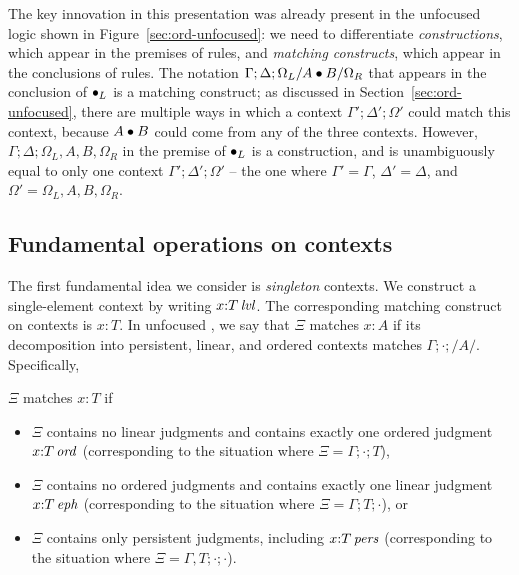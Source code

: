 
The key innovation in this presentation was already present in the
unfocused logic shown in Figure~\ref{sec:ord-unfocused}: we need to
differentiate {\it constructions}, which appear in the premises of
rules, and {\it matching constructs}, which appear in the conclusions
of rules.  The notation $\Gamma; \Delta; \Omega_L/A\mathbin{\bullet} B/\Omega_R$
that appears in the conclusion of ${\mathbin{\bullet}}_L$ is a matching construct;
as discussed in Section~\ref{sec:ord-unfocused}, there are multiple
ways in which a context $\Gamma'; \Delta'; \Omega'$ could match this
context, because $A \mathbin{\bullet} B$ could come from any of the three
contexts. However, $\Gamma; \Delta; \Omega_L,{A},{B}, \Omega_R$ in the
premise of ${\mathbin{\bullet}}_L$ is a construction, and is unambiguously equal
to only one context $\Gamma'; \Delta'; \Omega'$ -- the one where
$\Gamma' = \Gamma$, $\Delta' = \Delta$, and 
$\Omega' = \Omega_L, {A}, {B}, \Omega_R$.

\subsection{Fundamental operations on contexts}
\label{sec:fundamental-operations-on-contexts}

The first fundamental idea we consider is {\it singleton} contexts.
We construct a single-element context by writing $x{:}{T}\,{{\it lvl}}$.
The corresponding matching construct on contexts is 
$x{:}{T}$. In unfocused \ollll, we say that $\Xi$ matches 
$x{:}{A}$ if its decomposition into persistent, linear, and 
ordered contexts matches $\Gamma; \cdot; /A/$. Specifically,

\bigskip
\begin{definition}
  $\Xi$ matches $x{:}T$ if
\begin{itemize}
\item $\Xi$ contains no linear judgments and contains exactly
one
ordered judgment $x{:}{T}\,{{\it ord}}$ (corresponding to the situation where
$\Xi = \Gamma; \cdot; T$), 
\item $\Xi$ contains no ordered judgments and contains exactly
one linear judgment $x{:}{T}\,{{\it eph}}$ (corresponding to the situation where
$\Xi = \Gamma; T; \cdot$), or 
\item $\Xi$ contains only persistent judgments, including
$x{:}{T}\,{{\it pers}}$ (corresponding to the situation where
$\Xi = \Gamma, T; \cdot; \cdot$). 
\end{itemize}
\end{definition}
\bigskip

